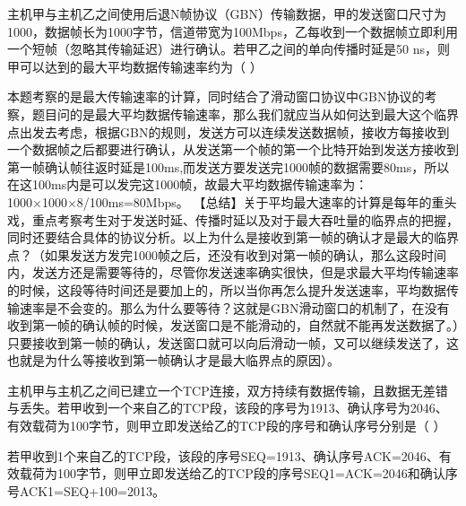 \question 主机甲与主机乙之间使用后退N帧协议（GBN）传输数据，甲的发送窗口尺寸为1000，数据帧长为1000字节，信道带宽为100Mbps，乙每收到一个数据帧立即利用一个短帧（忽略其传输延迟）进行确认。若甲乙之间的单向传播时延是50
ns，则甲可以达到的最大平均数据传输速率约为（ ）
\par{}
\begin{solution}本题考察的是最大传输速率的计算，同时结合了滑动窗口协议中GBN协议的考察，题目问的是最大平均数据传输速率，那么我们就应当从如何达到最大这个临界点出发去考虑，根据GBN的规则，发送方可以连续发送数据帧，接收方每接收到一个数据帧之后都要进行确认，从发送第一个帧的第一个比特开始到发送方接收到第一帧确认帧往返时延是100ms,而发送方要发送完1000帧的数据需要80ms，所以在这100ms内是可以发完这1000帧，故最大平均数据传输速率为：1000×1000×8/100ms=80Mbps。
【总结】关于平均最大速率的计算是每年的重头戏，重点考察考生对于发送时延、传播时延以及对于最大吞吐量的临界点的把握，同时还要结合具体的协议分析。以上为什么是接收到第一帧的确认才是最大的临界点？（如果发送方发完1000帧之后，还没有收到对第一帧的确认，那么这段时间内，发送方还是需要等待的，尽管你发送速率确实很快，但是求最大平均传输速率的时候，这段等待时间还是要加上的，所以当你再怎么提升发送速率，平均数据传输速率是不会变的。那么为什么要等待？这就是GBN滑动窗口的机制了，在没有收到第一帧的确认帧的时候，发送窗口是不能滑动的，自然就不能再发送数据了。）只要接收到第一帧的确认，发送窗口就可以向后滑动一帧，又可以继续发送了，这也就是为什么等接收到第一帧确认才是最大临界点的原因）。
\end{solution}
\question 主机甲与主机乙之间已建立一个TCP连接，双方持续有数据传输，且数据无差错与丢失。若甲收到一个来自乙的TCP段，该段的序号为1913、确认序号为2046、有效载荷为100字节，则甲立即发送给乙的TCP段的序号和确认序号分别是（
）
\par{}
\begin{solution}若甲收到1个来自乙的TCP段，该段的序号SEQ=1913、确认序号ACK=2046、有效载荷为100字节，则甲立即发送给乙的TCP段的序号SEQ1=ACK=2046和确认序号ACK1=SEQ+100=2013。
\end{solution}
